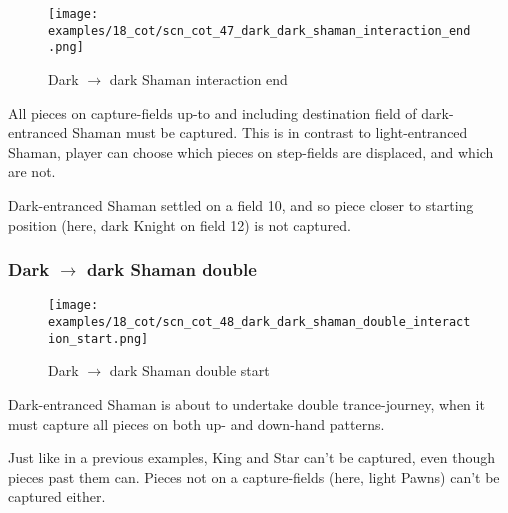 \clearpage %

\noindent
\begin{figure}[!h]
\texttt{[image: examples/18\_cot/scn\_cot\_47\_dark\_dark\_shaman\_interaction\_end.png]}
\caption{Dark $\rightarrow$ dark Shaman interaction end}
\label{fig:scn_cot_47_dark_dark_shaman_interaction_end}
\end{figure}

All pieces on capture-fields up-to and including destination field of dark-entranced
Shaman must be captured. This is in contrast to light-entranced Shaman, player can
choose which pieces on step-fields are displaced, and which are not.

Dark-entranced Shaman settled on a field 10, and so piece closer to starting position
(here, dark Knight on field 12) is not captured.

\clearpage %

\subsubsection*{Dark $\rightarrow$ dark Shaman double}
\label{sec:Conquest of Tlalocan/Trance-journey/Interactions/Dark --> dark Shaman double}

\vspace*{-1.4\baselineskip}
\noindent
\begin{figure}[!h]
\texttt{[image: examples/18\_cot/scn\_cot\_48\_dark\_dark\_shaman\_double\_interaction\_start.png]}
\caption{Dark $\rightarrow$ dark Shaman double start}
\label{fig:scn_cot_48_dark_dark_shaman_double_interaction_start}
\end{figure}

Dark-entranced Shaman is about to undertake double trance-journey, when it must
capture all pieces on both up- and down-hand patterns.

Just like in a previous examples, King and Star can't be captured, even though
pieces past them can. Pieces not on a capture-fields (here, light Pawns) can't
be captured either.

\clearpage %

